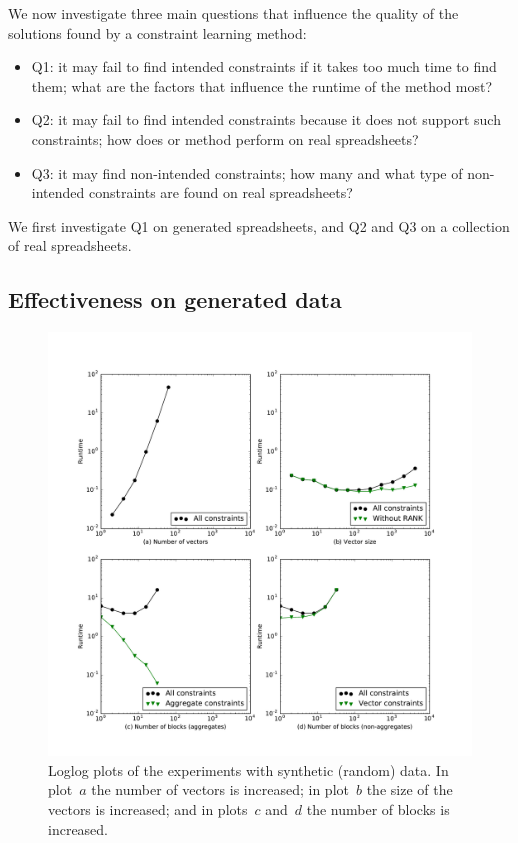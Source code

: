 We now investigate three main questions that influence the quality of the solutions found by a constraint learning method:
\begin{itemize}
\item Q1: it may fail to find intended constraints if it takes too much time to find them; what are the factors that influence the runtime of the method most?
\item Q2: it may fail to find intended constraints because it does not support such constraints; how does or method perform on real spreadsheets?
\item Q3: it may find non-intended constraints; how many and what type of non-intended constraints are found on real spreadsheets?
\end{itemize}
We first investigate Q1 on generated spreadsheets, and Q2 and Q3 on a collection of real spreadsheets.


\subsection{Effectiveness on generated data}

\begin{figure}[t]
  \centering
  \includegraphics[width=1\linewidth]{figures/scatter_plots.pdf}
  \caption{Loglog plots of the experiments with synthetic (random) data. In plot~$a$ the number of vectors is increased; in plot~$b$ the size of the vectors is increased; and in plots~$c$ and~$d$ the number of blocks is increased.}
  \label{fig:runtime_analysis}
\end{figure}

